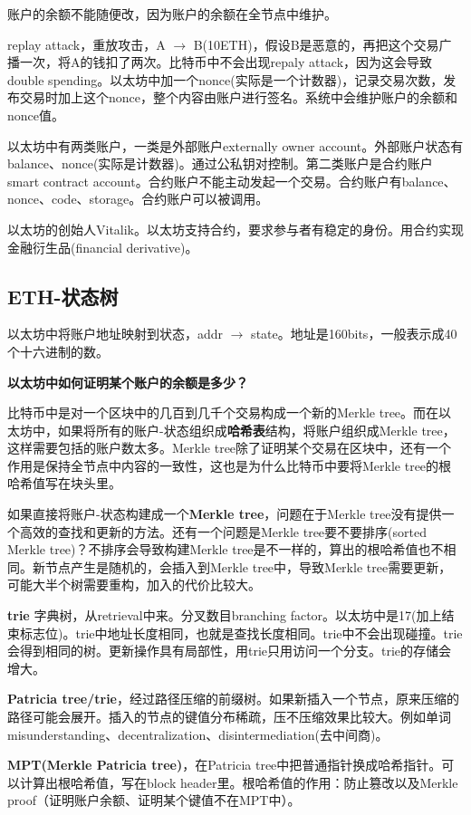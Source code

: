 \documentclass[10pt]{ctexart}
\begin{document}
账户的余额不能随便改，因为账户的余额在全节点中维护。

replay attack，重放攻击，A $\rightarrow$ B(10ETH)，假设B是恶意的，再把这个交易广播一次，将A的钱扣了两次。比特币中不会出现repaly attack，因为这会导致double spending。以太坊中加一个nonce(实际是一个计数器)，记录交易次数，发布交易时加上这个nonce，整个内容由账户进行签名。系统中会维护账户的余额和nonce值。

以太坊中有两类账户，一类是外部账户externally owner account。外部账户状态有balance、nonce(实际是计数器)。通过公私钥对控制。第二类账户是合约账户smart contract account。合约账户不能主动发起一个交易。合约账户有balance、nonce、code、storage。合约账户可以被调用。

以太坊的创始人Vitalik。以太坊支持合约，要求参与者有稳定的身份。用合约实现金融衍生品(financial derivative)。

\subsection{ETH-状态树}
以太坊中将账户地址映射到状态，addr $\rightarrow$ state。地址是160bits，一般表示成40个十六进制的数。

\textbf{以太坊中如何证明某个账户的余额是多少？}

比特币中是对一个区块中的几百到几千个交易构成一个新的Merkle tree。而在以太坊中，如果将所有的账户-状态组织成\textbf{哈希表}结构，将账户组织成Merkle tree，这样需要包括的账户数太多。Merkle tree除了证明某个交易在区块中，还有一个作用是保持全节点中内容的一致性，这也是为什么比特币中要将Merkle tree的根哈希值写在块头里。

如果直接将账户-状态构建成一个\textbf{Merkle tree}，问题在于Merkle tree没有提供一个高效的查找和更新的方法。还有一个问题是Merkle tree要不要排序(sorted Merkle tree)？不排序会导致构建Merkle tree是不一样的，算出的根哈希值也不相同。新节点产生是随机的，会插入到Merkle tree中，导致Merkle tree需要更新，可能大半个树需要重构，加入的代价比较大。

\textbf{trie} 字典树，从retrieval中来。分叉数目branching factor。以太坊中是17(加上结束标志位)。trie中地址长度相同，也就是查找长度相同。trie中不会出现碰撞。trie会得到相同的树。更新操作具有局部性，用trie只用访问一个分支。trie的存储会增大。

\textbf{Patricia tree/trie}，经过路径压缩的前缀树。如果新插入一个节点，原来压缩的路径可能会展开。插入的节点的键值分布稀疏，压不压缩效果比较大。例如单词misunderstanding、decentralization、disintermediation(去中间商)。

\textbf{MPT(Merkle Patricia tree)}，在Patricia tree中把普通指针换成哈希指针。可以计算出根哈希值，写在block header里。根哈希值的作用：防止篡改以及Merkle proof（证明账户余额、证明某个键值不在MPT中）。
\end{document}
